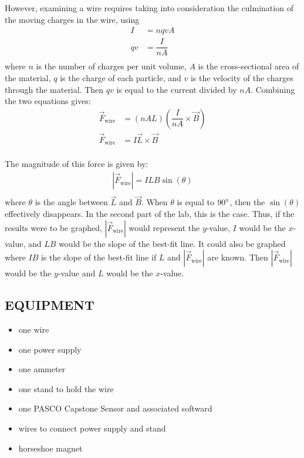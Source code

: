 \documentclass [12pt, letterpaper, twoside] {article}
\begin{document}
\noindent
However, examining a wire requires taking into consideration the culmination of the moving charges in the wire, using
\begin{equation}
  \begin{split}
    I &= nqvA \\
    qv &= \dfrac{I}{nA} \\ 
  \end{split}
\end{equation}
where \(n\) is the number of charges per unit volume, \(A\) is the cross-sectional area of the material, \(q\) is the charge of each particle, and \(v\) is the velocity of the charges through the material. Then \(qv\) is equal to the current divided by \(nA\). Combining the two equations gives:
\begin{equation}
  \begin{split}
    \vec{F}_{\text{wire}} &= (nAL)\left(\dfrac{I}{nA}\times{\vec{B}}\right) \\
    \vec{F}_{\text{wire}} &= I\vec{L}\times\vec{B} \\
  \end{split}
\end{equation}

\noindent
The magnitude of this force is given by:
\begin{equation*}
  \begin{split}
    |\vec{F}_{\text{wire}}| = ILB\sin(\theta) \\
  \end{split}
\end{equation*}
where \(\theta\) is the angle between \(\vec{L}\) and \(\vec{B}\). When \(\theta\) is equal to \(90\degree\), then the \(\sin(\theta)\) effectively disappears. In the second part of the lab, this is the case. Thus, if the results were to be graphed, \(|\vec{F}_{\text{wire}}|\) would represent the \(y\)-value, \(I\) would be the \(x\)-value, and \(LB\) would be the slope of the best-fit line. It could also be graphed where \(IB\) is the slope of the best-fit line if \(L\) and \(|\vec{F}_{\text{wire}}|\) are known. Then \(|\vec{F}_{\text{wire}}|\) would be the \(y\)-value and \(L\) would be the \(x\)-value.

\subsection* {EQUIPMENT}
  \noindent
  \begin {itemize}
    \itemsep0em
    \item {one wire}
    \item {one power supply}
    \item {one ammeter}
    \item {one stand to hold the wire}
    \item {one PASCO Capstone Sensor and associated softward}
    \item {wires to connect power supply and stand}
    \item {horseshoe magnet}
  \end {itemize}
\end{document}
